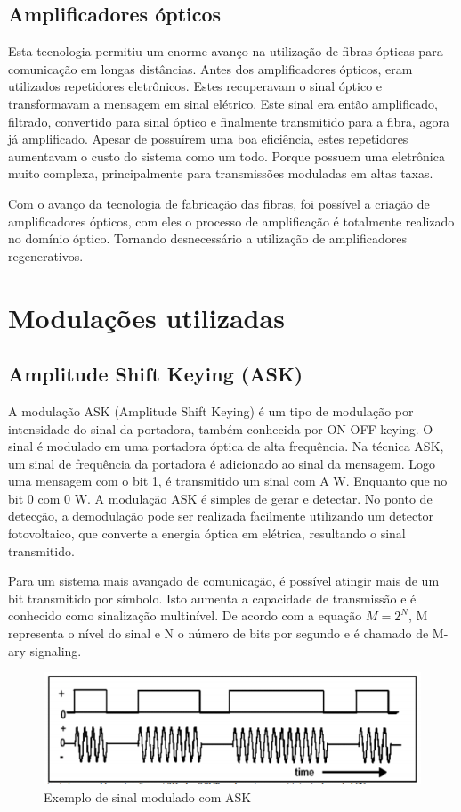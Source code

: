 \documentclass[article]{IEEEtran}
\begin{document}
\subsection{Amplificadores ópticos}
\par Esta tecnologia permitiu um enorme avanço na utilização de fibras ópticas para comunicação em longas distâncias. Antes dos amplificadores ópticos, eram utilizados repetidores eletrônicos. Estes recuperavam o sinal óptico e transformavam a mensagem em sinal elétrico. Este sinal era então amplificado, filtrado, convertido para sinal óptico e finalmente transmitido para a fibra, agora já amplificado. Apesar de possuírem uma boa eficiência, estes repetidores aumentavam o custo do sistema como um todo. Porque possuem uma eletrônica muito complexa, principalmente para transmissões moduladas em altas taxas.
\par Com o avanço da tecnologia de fabricação das fibras, foi possível a criação de amplificadores ópticos, com eles o processo de amplificação é totalmente realizado no domínio óptico. Tornando desnecessário a utilização de amplificadores regenerativos.


\section{Modulações utilizadas}
\subsection{Amplitude Shift Keying (ASK)}
\par A modulação ASK (Amplitude Shift Keying) é um tipo de modulação por intensidade do sinal da portadora, também conhecida por ON-OFF-keying. O sinal é modulado em uma portadora óptica de alta frequência. Na técnica ASK, um sinal de frequência da portadora é adicionado ao sinal da mensagem. Logo uma mensagem com o bit 1, é transmitido um sinal com A W. Enquanto que no bit 0 com 0 W. A modulação ASK é simples de gerar e detectar. No ponto de detecção, a demodulação pode ser realizada facilmente utilizando um detector fotovoltaico, que converte a energia óptica em elétrica, resultando o sinal transmitido.
\par	Para um sistema mais avançado de comunicação, é possível atingir mais de um bit transmitido por símbolo. Isto aumenta a capacidade de transmissão e é conhecido como sinalização multinível. De acordo com a equação $M = 2^N$, M representa o nível do sinal e N o número de bits por segundo e é chamado de M-ary signaling.
\begin{figure}[hb]
\includegraphics[width=\columnwidth]{ask.png}
\caption{Exemplo de sinal modulado com ASK}
\end{figure}
\end{document}
